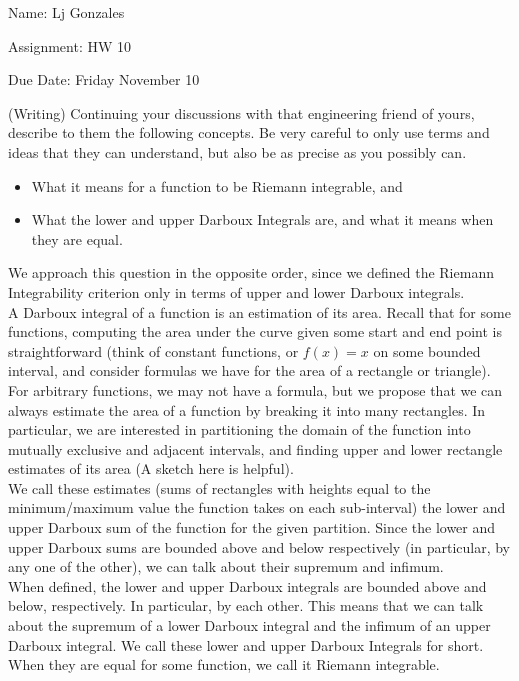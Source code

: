 \documentclass[11 pt]{article}
\begin{document}
    Name: Lj Gonzales

    Assignment: HW 10

    Due Date: Friday November 10
    \break
\begin{problem}
	(Writing) Continuing your discussions with that engineering friend of yours, describe to them the following concepts. Be very careful to only use terms and ideas that they can understand, but also be as precise as you possibly can.
	\begin{itemize}
		\item What it means for a function to be Riemann integrable, and
		\item What the lower and upper Darboux Integrals are, and what it means when they are equal.
	\end{itemize}
\end{problem}
\begin{solution}
	We approach this question in the opposite order, since we defined the Riemann Integrability criterion only in terms of upper and lower Darboux integrals.\\
	A Darboux integral of a function is an estimation of its area. Recall that for some functions, computing the area under the curve given some start and end point is straightforward (think of constant functions, or  $f(x)=x$ on some bounded interval, and consider formulas we have for the area of a rectangle or triangle).\\
	For arbitrary functions, we may not have a formula, but we propose that we can always estimate the area of a function by breaking it into many rectangles. In particular, we are interested in partitioning the domain of the function into mutually exclusive and adjacent intervals, and finding upper and lower rectangle estimates of its area (A sketch here is helpful).\\
	We call these estimates (sums of rectangles with heights equal to the minimum/maximum value the function takes on each sub-interval) the lower and upper Darboux sum of the function for the given partition. Since the lower and upper Darboux sums are bounded above and below respectively (in particular, by any one of the other), we can talk about their supremum and infimum.\\
	When defined, the lower and upper Darboux integrals are bounded above and below, respectively. In particular, by each other. This means that we can talk about the supremum of a lower Darboux integral and the infimum of an upper Darboux integral. We call these lower and upper Darboux Integrals for short. When they are equal for some function, we call it Riemann integrable.	
\end{solution} 
\end{document}

